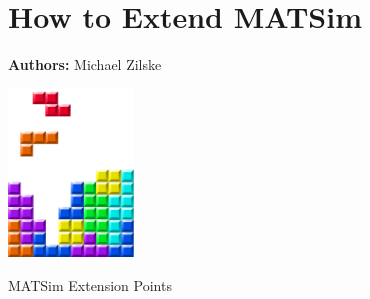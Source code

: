 \chapter{How to Extend MATSim }
\label{ch:extensionpoints}

\hfill \textbf{Authors:} Michael Zilske

\begin{center} \includegraphics[width=0.25\textwidth, angle=0]{figures/MATSimBook.png} \end{center}

MATSim Extension Points


